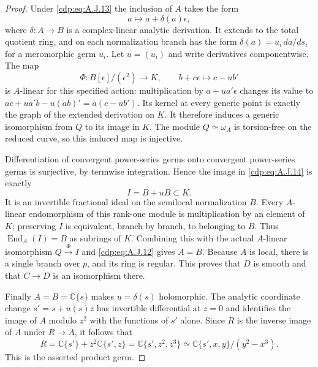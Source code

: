 \begin{proof}
Under \eqref{cdp:eq:A.J.13} the inclusion of $A$ takes the form
\[
 a\longmapsto a+\delta(a)\epsilon,
\]
where $\delta:A\to B$ is a complex-linear analytic
derivation. It extends to the total quotient ring, and on
each normalization branch has the form
$\delta(a)=u_i\,da/ds_i$ for a meromorphic germ $u_i$.
Let $u=(u_i)$ and write derivatives componentwise.
The map
\[
 \Phi:B[\epsilon]/(\epsilon^2)\longrightarrow K,
 \qquad b+c\epsilon\longmapsto c-u b'
                                                        \tag{A.J.14}\label{cdp:eq:A.J.14}
\]
is $A$-linear for this specified action: multiplication by
$a+u a'\epsilon$ changes its value to
$ac+u a'b-u(ab)'=a(c-u b')$. Its kernel at every generic
point is exactly the graph of the extended derivation on
$K$. It therefore induces a generic isomorphism from $Q$
to its image in $K$. The module $Q\simeq\omega_A$ is
torsion-free on the reduced curve, so this induced map is
injective.

Differentiation of convergent power-series germs onto
convergent power-series germs is surjective, by termwise
integration. Hence the image in \eqref{cdp:eq:A.J.14} is exactly
\[
 I=B+uB\subset K.                                \tag{A.J.15}\label{cdp:eq:A.J.15}
\]
It is an invertible fractional ideal on the semilocal
normalization $B$. Every $A$-linear endomorphism of this
rank-one module is multiplication by an element of $K$;
preserving $I$ is equivalent, branch by branch, to belonging
to $B$. Thus $\operatorname{End}_A(I)=B$ as subrings of
$K$. Combining this with the actual $A$-linear isomorphism
$Q\xrightarrow{\Phi}I$ and \eqref{cdp:eq:A.J.12} gives $A=B$.
Because $A$ is local, there is a single branch over $p$,
and its ring is regular. This proves that $D$ is smooth
and that $C\to D$ is an isomorphism there.

Finally $A=B=\mathbb C\{s\}$ makes $u=\delta(s)$
holomorphic. The analytic coordinate change
$s'=s+u(s)z$ has invertible differential at $z=0$ and
identifies the image of $A$ modulo $z^2$ with the functions
of $s'$ alone. Since $R$ is the inverse image of $A$ under
$\overline R\to\overline A$, it follows that
\[
 R=\mathbb C\{s'\}+z^2\mathbb C\{s',z\}
   =\mathbb C\{s',z^2,z^3\}
   \simeq\mathbb C\{s',x,y\}/(y^2-x^3).
                                                        \tag{A.J.16}\label{cdp:eq:A.J.16}
\]
This is the asserted product germ.
\end{proof}


